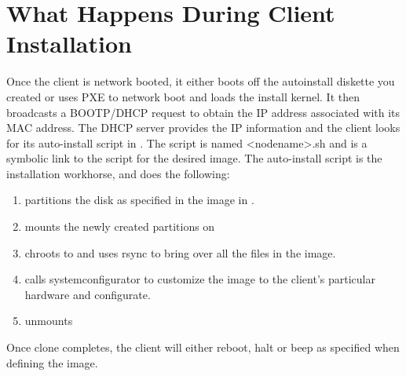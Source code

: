 %
%
%

\section{What Happens During Client Installation}
\label{app:client-install}

Once the client is network booted, it either boots off the autoinstall
diskette you created or uses PXE to network boot and loads the install 
kernel. It then broadcasts a BOOTP/DHCP request
to obtain the IP address associated with its MAC address. The DHCP
server provides the IP information and the client looks for its auto-install
script in . The script is named <nodename>.sh and
is a symbolic link to the script for the desired image.
The auto-install script is the installation workhorse, and does the
following:

\begin{enumerate}
\item partitions the disk as specified in the image in 
        .

\item mounts the newly created partitions on 
  
\item chroots to  and uses rsync to bring over all 
        the files in the image.

\item calls systemconfigurator to customize the image to the client's
        particular hardware and configurate.

\item unmounts 
\end{enumerate}

Once clone completes, the client will either reboot, halt or beep as 
specified when defining the image.

